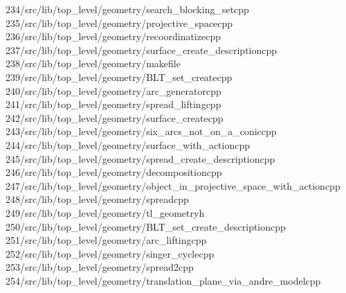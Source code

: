 \begin{tabbing}
234\>/src/lib/top\_level/geometry/search\_blocking\_setcpp\\[0pt]
235\>/src/lib/top\_level/geometry/projective\_spacecpp\\[0pt]
236\>/src/lib/top\_level/geometry/recoordinatizecpp\\[0pt]
237\>/src/lib/top\_level/geometry/surface\_create\_descriptioncpp\\[0pt]
238\>/src/lib/top\_level/geometry/makefile\\[0pt]
239\>/src/lib/top\_level/geometry/BLT\_set\_createcpp\\[0pt]
240\>/src/lib/top\_level/geometry/arc\_generatorcpp\\[0pt]
241\>/src/lib/top\_level/geometry/spread\_liftingcpp\\[0pt]
242\>/src/lib/top\_level/geometry/surface\_createcpp\\[0pt]
243\>/src/lib/top\_level/geometry/six\_arcs\_not\_on\_a\_coniccpp\\[0pt]
244\>/src/lib/top\_level/geometry/surface\_with\_actioncpp\\[0pt]
245\>/src/lib/top\_level/geometry/spread\_create\_descriptioncpp\\[0pt]
246\>/src/lib/top\_level/geometry/decompositioncpp\\[0pt]
247\>/src/lib/top\_level/geometry/object\_in\_projective\_space\_with\_actioncpp\\[0pt]
248\>/src/lib/top\_level/geometry/spreadcpp\\[0pt]
249\>/src/lib/top\_level/geometry/tl\_geometryh\\[0pt]
250\>/src/lib/top\_level/geometry/BLT\_set\_create\_descriptioncpp\\[0pt]
251\>/src/lib/top\_level/geometry/arc\_liftingcpp\\[0pt]
252\>/src/lib/top\_level/geometry/singer\_cyclecpp\\[0pt]
253\>/src/lib/top\_level/geometry/spread2cpp\\[0pt]
254\>/src/lib/top\_level/geometry/translation\_plane\_via\_andre\_modelcpp\\[0pt]

\end{tabbing}
